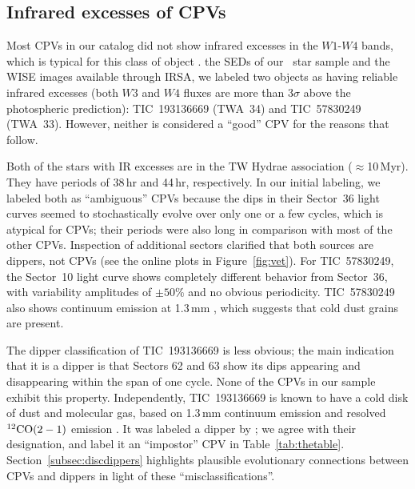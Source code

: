 \documentclass[11pt,twocolumn,tighten]{aastex63}
\begin{document}
\subsection{Infrared excesses of CPVs}
\label{subsec:irexcess}

Most CPVs in our catalog did not show infrared excesses in the
$W1$-$W4$ bands, which is typical for this class of object
\citep{2017AJ....153..152S}.   the SEDs of our
\nallcands\ star sample and the WISE images available through IRSA, we
labeled two objects as having reliable infrared excesses (both $W3$
and $W4$ fluxes are more than 3$\sigma$ above the photospheric
prediction): TIC~193136669 (TWA~34) and TIC~57830249 (TWA~33).
However, neither is considered a ``good'' CPV for the reasons that
follow.

Both of the stars with IR excesses are in the TW Hydrae association
($\approx$10\,Myr).  They have periods of 38\,hr and 44\,hr,
respectively.  In our initial labeling, we labeled both as
``ambiguous'' CPVs because the dips in their Sector~36 light curves
seemed to stochastically evolve over only one or a few cycles, which
is atypical for CPVs; their periods were also long in comparison with
most of the other CPVs.  Inspection of additional sectors clarified
that both sources are dippers, not CPVs (see the online plots in
Figure~\ref{fig:vet}).  For TIC~57830249, the Sector~10 light curve
shows completely different behavior from Sector~36, with variability
amplitudes of $\pm 50\%$ and no obvious periodicity.  TIC~57830249
also shows continuum emission at 1.3\,mm \citep{2015A&A...582L...5R},
which suggests that cold dust grains are present.

The dipper classification of TIC~193136669 is less obvious; the main
indication that it is a dipper is that Sectors 62 and 63 show its dips
appearing and disappearing within the span of one cycle.  None of the
CPVs in our sample exhibit this property.  Independently,
TIC~193136669 is known to have a cold disk of dust and molecular gas,
based on 1.3\,mm continuum emission and resolved $^{12}{\rm CO}(2-1)$
emission \citep{2015A&A...582L...5R}.  It was labeled a dipper by
\citet{2022ApJS..263...14C}; we agree with their designation, and
label it an ``impostor'' CPV in Table~\ref{tab:thetable}.
Section~\ref{subsec:discdippers} highlights plausible evolutionary
connections between CPVs and dippers in light of these
``misclassifications''.
\end{document}
